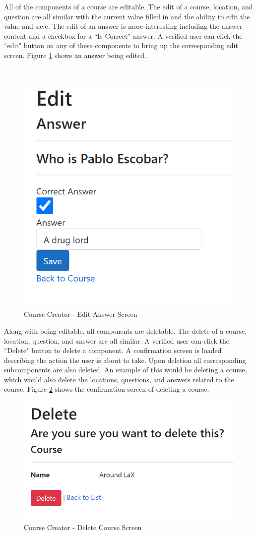 \clearpage
All of the components of a course are editable. The edit of a course, location, and question are all similar with the current value filled in and the ability to edit the value and save. The edit of an answer is more interesting including the answer content and a checkbox for a ``Is Correct" answer. A verified user can click the ``edit" button on any of these components to bring up the corresponding edit screen. Figure \ref{CC Edit Answer} shows an answer being edited. \\
\\
\\
\begin{figure}[htb]
	\centering
	\includegraphics[width=.6\textwidth]{Requirements/assets/cc-edit-answer.png}
	\caption[Course Creator - Edit Answer Screen]{\label{CC Edit Answer}Course Creator - Edit Answer Screen}
\end{figure}
\clearpage
Along with being editable, all components are deletable. The delete of a course, location, question, and answer are all similar. A verified user can click the ``Delete" button to delete a component. A confirmation screen is loaded describing the action the user is about to take. Upon deletion all corresponding subcomponents are also deleted. An example of this would be deleting a course, which would also delete the locations, questions, and answers related to the course. Figure \ref{CC Delete Course} shows the confirmation screen of deleting a course.
\begin{figure}[htb]
	\centering
	\includegraphics[width=.6\textwidth]{Requirements/assets/cc-delete-course.png}
	\caption[Course Creator - Delete Course Screen]{\label{CC Delete Course}Course Creator - Delete Course Screen}
\end{figure}
